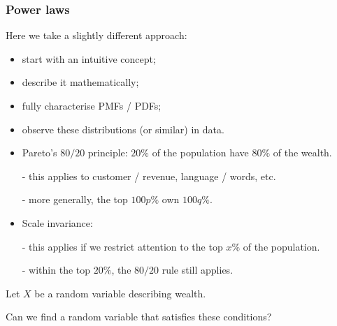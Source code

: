\documentclass[t,8pt]{beamer}
\begin{document}
\begin{frame}
	\frametitle{Power laws}
	
	Here we take a slightly different approach:
	\begin{itemize}
		\item start with an intuitive concept;
		\item describe it mathematically;
		\item fully characterise PMFs / PDFs;
		\item observe these distributions (or similar) in data.
	\end{itemize}
	
	\begin{itemize}
		\item Pareto's $80/20$ principle: $20\%$ of the population have $80\%$ of the wealth. \par
		{\small\color{NavyBlue}
			- this applies to customer / revenue, language / words, etc.
		}\par
		{\small\color{NavyBlue}
			- more generally, the top $100p\%$ own $100q\%$.
		}\par
		\item Scale invariance: \par
		- this applies if we restrict attention to the top $x\%$ of the population. \par
		{\small\color{NavyBlue}
			- within the top $20\%$, the $80/20$ rule still applies.
		}
	\end{itemize}
	
	Let $X$ be a random variable describing wealth. \par
	Can we find a random variable that satisfies these conditions?
\end{frame}
\end{document}
